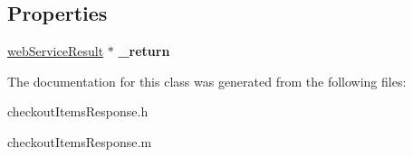 \subsection*{Properties}
\begin{DoxyCompactItemize}
\item 
\hypertarget{interfacecheckout_items_response_a8a0a790c46e8913e894c04bda159119c}{}\hyperlink{interfaceweb_service_result}{web\+Service\+Result} $\ast$ {\bfseries \+\_\+return}\label{interfacecheckout_items_response_a8a0a790c46e8913e894c04bda159119c}

\end{DoxyCompactItemize}


The documentation for this class was generated from the following files\+:\begin{DoxyCompactItemize}
\item 
checkout\+Items\+Response.\+h\item 
checkout\+Items\+Response.\+m\end{DoxyCompactItemize}
